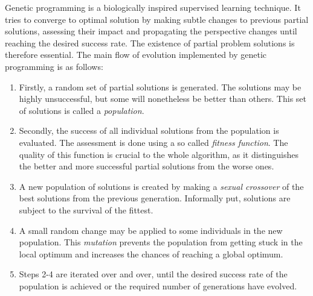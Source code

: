 \documentclass[12pt,twoside]{fithesis2}		%
\renewcommand{\_}{\leavevmode \kern0.0em\vbox{\hrule width0.4em}}
\begin{document}
Genetic programming \parencite{genetic-programming} is a biologically inspired supervised learning technique. 
It tries to converge to optimal 
solution by making subtle changes to previous partial solutions, assessing their impact and propagating the perspective changes
until reaching the desired success rate. The existence of partial problem solutions is therefore essential.
The main flow of evolution implemented by genetic programming is as follows:
\begin{enumerate} \rightskip=2em
\item Firstly, a random set of partial solutions is generated. The solutions may be highly unsuccessful,
but some will nonetheless be better than others. This set of solutions is called a \textit{population}.
\item Secondly, the success of all individual solutions from the population is evaluated. The assessment is done using
a so called \textit{fitness function}. The quality of this function is crucial to the whole algorithm, as it
distinguishes the better and more successful partial solutions from the worse ones.
\item A new population of solutions is created by making a \textit{sexual crossover} of the best solutions from the 
previous generation. Informally put, solutions are subject to the survival of the fittest.
\item A small random change may be applied to some individuals in the new population. This \textit{mutation} prevents
the population from getting stuck in the local optimum and increases the chances of reaching a global optimum.
\item Steps 2-4 are iterated over and over, until the desired success rate of the population is achieved or the
required number of generations have evolved.
\end{enumerate}
\end{document}
